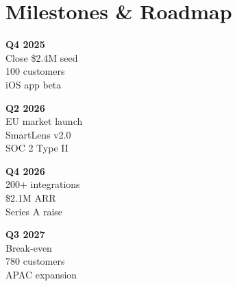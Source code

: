 \section{\sectionicon{\faFlag}Milestones \& Roadmap}

\noindent
\begin{minipage}[t]{0.23\linewidth}
  \begin{tcolorbox}[milebox]
    \centering
    {\color{NexaGold}\bfseries Q4 2025}\\[3pt]
    {\small\color{TextBody}
      Close \$2.4M seed\\[2pt]
      100 customers\\[2pt]
      iOS app beta}
  \end{tcolorbox}
\end{minipage}\hspace{4pt}
\begin{minipage}[t]{0.23\linewidth}
  \begin{tcolorbox}[milebox]
    \centering
    {\color{NexaTeal}\bfseries Q2 2026}\\[3pt]
    {\small\color{TextBody}
      EU market launch\\[2pt]
      SmartLens v2.0\\[2pt]
      SOC 2 Type II}
  \end{tcolorbox}
\end{minipage}\hspace{4pt}
\begin{minipage}[t]{0.23\linewidth}
  \begin{tcolorbox}[milebox]
    \centering
    {\color{NexaNavy}\bfseries Q4 2026}\\[3pt]
    {\small\color{TextBody}
      200+ integrations\\[2pt]
      \$2.1M ARR\\[2pt]
      Series A raise}
  \end{tcolorbox}
\end{minipage}\hspace{4pt}
\begin{minipage}[t]{0.23\linewidth}
  \begin{tcolorbox}[milebox]
    \centering
    {\color{NexaNavy}\bfseries Q3 2027}\\[3pt]
    {\small\color{TextBody}
      Break-even\\[2pt]
      780 customers\\[2pt]
      APAC expansion}
  \end{tcolorbox}
\end{minipage}


